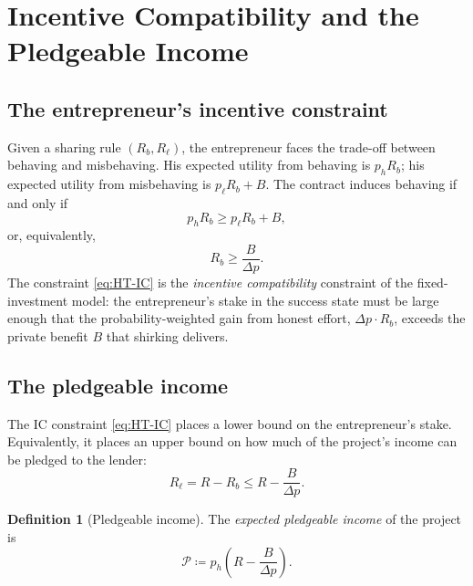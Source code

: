 \documentclass[11pt,a4paper,oneside]{book}
\def\leq{\leqslant}
\def\geq{\geqslant}
\theoremstyle{plain}
\theoremstyle{definition}
\newtheorem{definition}[theorem]{Definition}
\theoremstyle{remark}
\numberwithin{equation}{chapter}
\begin{document}
\section{Incentive Compatibility and the Pledgeable Income}
\label{sec:HT-IC}

\subsection{The entrepreneur's incentive constraint}

Given a sharing rule $(R_b, R_\ell)$, the entrepreneur faces the trade-off between behaving and misbehaving.
His expected utility from behaving is $p_h R_b$; his expected utility from misbehaving is $p_\ell R_b + B$.
The contract induces behaving if and only if
\begin{equation}\label{eq:HT-IC-raw}
  p_h R_b \geq p_\ell R_b + B,
\end{equation}
or, equivalently,
\begin{equation}\label{eq:HT-IC}
  R_b \geq \frac{B}{\Delta p}.
  \tag{IC}
\end{equation}
The constraint \eqref{eq:HT-IC} is the \emph{incentive compatibility} constraint of the fixed-investment model: the entrepreneur's stake in the success state must be large enough that the probability-weighted gain from honest effort, $\Delta p \cdot R_b$, exceeds the private benefit $B$ that shirking delivers.

\subsection{The pledgeable income}

The IC constraint \eqref{eq:HT-IC} places a lower bound on the entrepreneur's stake.
Equivalently, it places an upper bound on how much of the project's income can be pledged to the lender:
\begin{equation*}
  R_\ell = R - R_b \leq R - \frac{B}{\Delta p}.
\end{equation*}

\begin{definition}[Pledgeable income]\label{def:pledgeable}
The \emph{expected pledgeable income} of the project is
\begin{equation}\label{eq:pledgeable}
  \mathcal{P} \coloneqq p_h \left( R - \frac{B}{\Delta p} \right).
\end{equation}
\end{definition}
\end{document}
